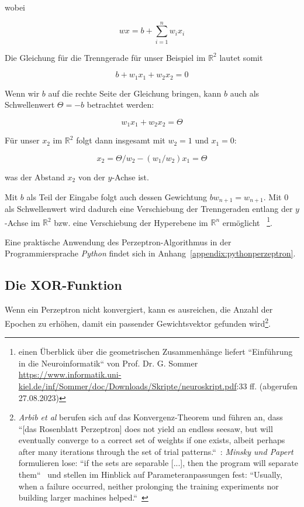 \noindent
wobei

\begin{equation}
wx = b + \sum^n_{i=1} w_ix_i
\label{eq:gl-net}
\end{equation}

\noindent
Die Gleichung für die Trenngerade für unser Beispiel im $\mathbb{R}^2$ lautet somit

\begin{equation}
b + w_1x_1 + w_2x_2 = 0
\end{equation}

\noindent
Wenn wir $b$ auf die rechte Seite der Gleichung bringen, kann $b$ auch als Schwellenwert $\Theta = -b$ betrachtet werden:

\begin{equation}
w_1x_1 + w_2x_2 = \Theta
\end{equation}

\noindent
Für unser $x_2$ im $ \mathbb{R}^2$ folgt dann insgesamt mit $w_2 = 1$ und $x_1 = 0$:

\begin{equation}
x_2 = \Theta/w_2 -(w_1/w_2)x_1  = \Theta
\end{equation}

\noindent
was der Abstand $x_2$ von der $y$-Achse ist.

\noindent
Mit $b$ als Teil der Eingabe folgt auch dessen Gewichtung $bw_{n+1} = w_{n+1}$.
Mit $0$ als Schwellenwert wird dadurch eine Verschiebung der Trenngeraden entlang der $y$-Achse im $ \mathbb{R}^2$ bzw. eine Verschiebung der Hyperebene im $ \mathbb{R}^n$ ermöglicht~\cite[215]{Ert21a} \footnote{
    einen Überblick über die geometrischen Zusammenhänge liefert ``Einführung in die Neuroinformatik`` von Prof. Dr. G. Sommer \url{https://www.informatik.uni-kiel.de/inf/Sommer/doc/Downloads/Skripte/neuroskript.pdf}:33 ff. (abgerufen 27.08.2023)
}.


Eine praktische Anwendung des Perzeptron-Algorithmus in der Programmiersprache \textit{Python} findet sich in Anhang~\ref{appendix:pythonperzeptron}.




\subsection{Die XOR-Funktion}

Wenn ein Perzeptron nicht konvergiert, kann es ausreichen, die Anzahl der Epochen zu erhöhen, damit ein passender Gewichtsvektor gefunden wird\footnote{
    \textit{Arbib et al} berufen sich auf das Konvergenz-Theorem und führen an, dass ``[das Rosenblatt Perzeptron] does not yield an endless seesaw, but will eventually converge to a correct set of weights if one exists, albeit perhaps after many iterations through the set of trial patterns.``~\cite[20]{Arb03}: \textit{Minsky und Papert} formulieren lose: ``if the sets are separable [...], then the program will separate them``~\cite[165]{MP88} und stellen im Hinblick auf Parameteranpassungen fest: ``Usually, when a failure occurred, neither prolonging the training experiments nor building larger machines helped.``~\cite[xi]{MP88}
}.

